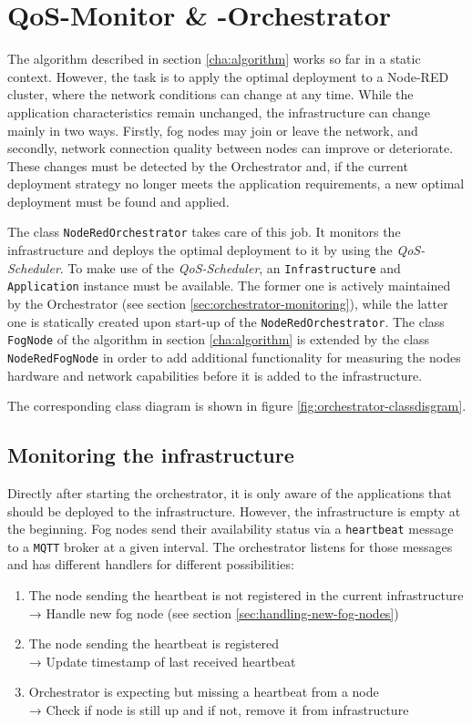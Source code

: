 \chapter{QoS-Monitor \& -Orchestrator\label{cha:orchestrator}}

The algorithm described in section \ref{cha:algorithm} works so far in a static context. However, the task is to apply the optimal deployment to a Node-RED cluster, where the network conditions can change at any time. While the application characteristics remain unchanged, the infrastructure can change mainly in two ways. Firstly, fog nodes may join or leave the network, and secondly, network connection quality between nodes can improve or deteriorate. These changes must be detected by the Orchestrator and, if the current deployment strategy no longer meets the application requirements, a new optimal deployment must be found and applied.

The class \texttt{NodeRedOrchestrator} takes care of this job. It monitors the infrastructure and deploys the optimal deployment to it by using the \textit{QoS-Scheduler}. To make use of the \textit{QoS-Scheduler}, an \texttt{Infrastructure} and \texttt{Application} instance must be available. The former one is actively maintained by the Orchestrator (see section \ref{sec:orchestrator-monitoring}), while the latter one is statically created upon start-up of the \texttt{NodeRedOrchestrator}. The class \texttt{FogNode} of the algorithm in section \ref{cha:algorithm} is extended by the class \texttt{NodeRedFogNode} in order to add additional functionality for measuring the nodes hardware and network capabilities before it is added to the infrastructure.

The corresponding class diagram is shown in figure \ref{fig:orchestrator-classdisgram}.

\section{Monitoring the infrastructure\label{sec:orchestrator-monitoring}}

Directly after starting the orchestrator, it is only aware of the applications that should be deployed to the infrastructure. However, the infrastructure is empty at the beginning. Fog nodes send their availability status via a \texttt{heartbeat} message to a \texttt{MQTT} broker at a given interval. The orchestrator listens for those messages and has different handlers for different possibilities:
\begin{enumerate}
    \item The node sending the heartbeat is not registered in the current infrastructure\\
    → Handle new fog node (see section \ref{sec:handling-new-fog-nodes})
    \item The node sending the heartbeat is registered\\
    → Update timestamp of last received heartbeat
    \item Orchestrator is expecting but missing a heartbeat from a node\\
    → Check if node is still up and if not, remove it from infrastructure
\end{enumerate}

